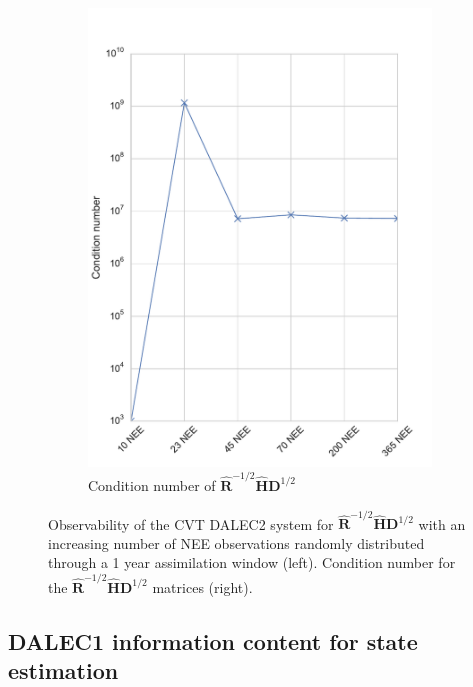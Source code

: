 \begin{figure}[ht]
\begin{subfigure}[b]{0.4\textwidth}
        \includegraphics[width=\textwidth]{chapter/chapter5/dalec2_obsrankcondcvtwind.pdf}
        \caption{Condition number of $\hat{\textbf{R}}^{-1/2}\hat{\textbf{H}}\textbf{D}^{1/2}$}
        \label{chap5:fig:D2_observabilitycondcvtwind}
    \end{subfigure}
    \caption{Observability of the CVT DALEC2 system for $\hat{\textbf{R}}^{-1/2}\hat{\textbf{H}}\textbf{D}^{1/2}$ with an increasing number of NEE observations randomly distributed through a 1 year assimilation window (left). Condition number for the $\hat{\textbf{R}}^{-1/2}\hat{\textbf{H}}\textbf{D}^{1/2}$ matrices (right).}
    \label{chap5:fig:D2_cvtobservabilitywind}
\end{figure}


\subsection{DALEC1 information content for state estimation} \label{chap5:sec:D1_IC} %
